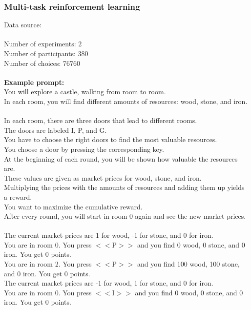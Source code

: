 \documentclass[pdflatex,sn-nature]{sn-jnl}%
\theoremstyle{thmstyleone}%
\theoremstyle{thmstyletwo}%
\theoremstyle{thmstylethree}%
\begin{document}
\subsubsection*{Multi-task reinforcement learning}
Data source: \cite{tomov2021multi} \\ $~$ \\
Number of experiments: 2 $~$\\ 
Number of participants: 380 $~$\\ 
Number of choices: 76760 $~$\\ 
 $~$\\ 
\textbf{Example prompt:}
 $~$\\ 
You will explore a castle, walking from room to room. $~$\\ 
In each room, you will find different amounts of resources: wood, stone, and iron. $~$\\ 
In each room, there are three doors that lead to different rooms. $~$\\ 
The doors are labeled I, P, and G. $~$\\ 
You have to choose the right doors to find the most valuable resources. $~$\\ 
You choose a door by pressing the corresponding key. $~$\\ 
At the beginning of each round, you will be shown how valuable the resources are. $~$\\ 
These values are given as market prices for wood, stone, and iron. $~$\\ 
Multiplying the prices with the amounts of resources and adding them up yields a reward. $~$\\ 
You want to maximize the cumulative reward. $~$\\ 
After every round, you will start in room 0 again and see the new market prices. $~$\\ 
 $~$\\ 
The current market prices are 1 for wood, -1 for stone, and 0 for iron. $~$\\ 
You are in room 0. You press $<<$P$>>$ and you find 0 wood, 0 stone, and 0 iron. You get 0 points. $~$\\ 
You are in room 2. You press $<<$P$>>$ and you find 100 wood, 100 stone, and 0 iron. You get 0 points. $~$\\ 
The current market prices are -1 for wood, 1 for stone, and 0 for iron. $~$\\ 
You are in room 0. You press $<<$I$>>$ and you find 0 wood, 0 stone, and 0 iron. You get 0 points. $~$\\ 
\end{document}
